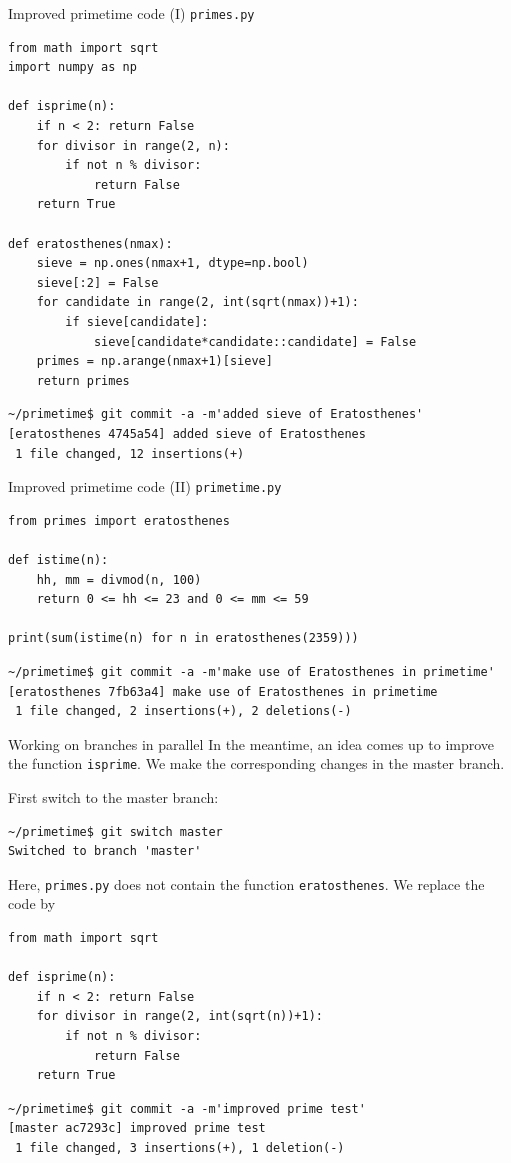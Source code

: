\documentclass[svgnames]{beamer}
\begin{document}
\begin{frame}[fragile]{Improved primetime code (I)}
 \texttt{primes.py}
 \begin{lstlisting}
from math import sqrt
import numpy as np

def isprime(n):
    if n < 2: return False
    for divisor in range(2, n):
        if not n % divisor:
            return False
    return True

def eratosthenes(nmax):
    sieve = np.ones(nmax+1, dtype=np.bool)
    sieve[:2] = False
    for candidate in range(2, int(sqrt(nmax))+1):
        if sieve[candidate]:
            sieve[candidate*candidate::candidate] = False
    primes = np.arange(nmax+1)[sieve]
    return primes
 \end{lstlisting}
 \begin{lstlisting}
~/primetime$ git commit -a -m'added sieve of Eratosthenes'
[eratosthenes 4745a54] added sieve of Eratosthenes
 1 file changed, 12 insertions(+)
 \end{lstlisting}
\end{frame}

\begin{frame}[fragile]{Improved primetime code (II)}
 \addtolength\linewidth{0.7truecm}
 \texttt{primetime.py}
 \begin{lstlisting}
from primes import eratosthenes

def istime(n):
    hh, mm = divmod(n, 100)
    return 0 <= hh <= 23 and 0 <= mm <= 59

print(sum(istime(n) for n in eratosthenes(2359)))
 \end{lstlisting}
 \begin{lstlisting}
~/primetime$ git commit -a -m'make use of Eratosthenes in primetime'
[eratosthenes 7fb63a4] make use of Eratosthenes in primetime
 1 file changed, 2 insertions(+), 2 deletions(-)
 \end{lstlisting}
\end{frame}

\begin{frame}[fragile]{Working on branches in parallel}
 In the meantime, an idea comes up to improve the function \texttt{isprime}.
 We make the corresponding changes in the master branch.

 First switch to the master branch:
 \begin{lstlisting}
~/primetime$ git switch master
Switched to branch 'master'
 \end{lstlisting}

 Here, \texttt{primes.py} does not contain the function \texttt{eratosthenes}.
 We replace the code by
 \begin{lstlisting}
from math import sqrt

def isprime(n):
    if n < 2: return False
    for divisor in range(2, int(sqrt(n))+1):
        if not n % divisor:
            return False
    return True
 \end{lstlisting}
 \begin{lstlisting}
~/primetime$ git commit -a -m'improved prime test'
[master ac7293c] improved prime test
 1 file changed, 3 insertions(+), 1 deletion(-)
 \end{lstlisting}
\end{frame}
\end{document}
